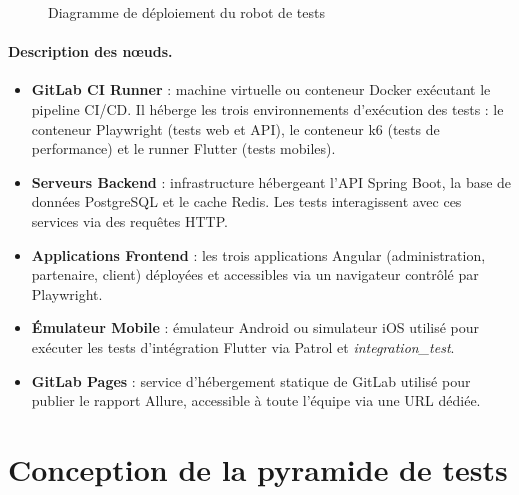 \begin{figure}[H]
\caption{Diagramme de déploiement du robot de tests}
\label{fig:deployment-diagram}
\end{figure}

\paragraph{Description des n\oe{}uds.}
\begin{itemize}[nosep]
    \item \textbf{GitLab CI Runner} : machine virtuelle ou conteneur Docker exécutant le pipeline CI/CD. Il héberge les trois environnements d'exécution des tests : le conteneur Playwright (tests web et API), le conteneur k6 (tests de performance) et le runner Flutter (tests mobiles).
    \item \textbf{Serveurs Backend} : infrastructure hébergeant l'API Spring Boot, la base de données PostgreSQL et le cache Redis. Les tests interagissent avec ces services via des requêtes HTTP.
    \item \textbf{Applications Frontend} : les trois applications Angular (administration, partenaire, client) déployées et accessibles via un navigateur contrôlé par Playwright.
    \item \textbf{Émulateur Mobile} : émulateur Android ou simulateur iOS utilisé pour exécuter les tests d'intégration Flutter via Patrol et \textit{integration\_test}.
    \item \textbf{GitLab Pages} : service d'hébergement statique de GitLab utilisé pour publier le rapport Allure, accessible à toute l'équipe via une URL dédiée.
\end{itemize}

\section{Conception de la pyramide de tests}
\label{sec:pyramide-tests}

